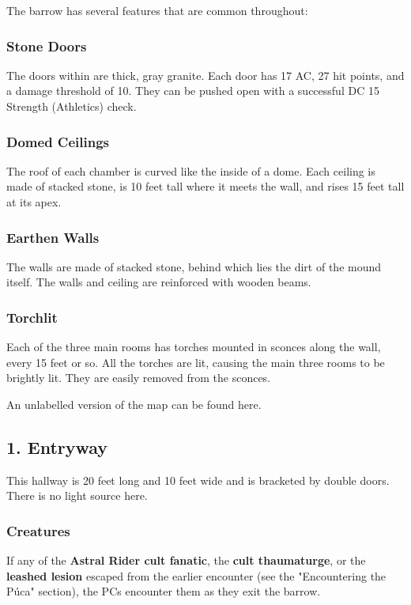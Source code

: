 \documentclass[10pt,a4paper,twoside,bg=print,twocolumn,openany,nodeprecatedcode]{dndbook}
\begin{document}
The barrow has several features that are common throughout:

\subsubsection{Stone Doors}
The doors within are thick, gray granite. Each door has 17 AC, 27 hit points, and a damage threshold of 10. They can be pushed open with a successful DC 15 Strength (Athletics) check.

\subsubsection{Domed Ceilings}
The roof of each chamber is curved like the inside of a dome. Each ceiling is made of stacked stone, is 10 feet tall where it meets the wall, and rises 15 feet tall at its apex.

\subsubsection{Earthen Walls}
The walls are made of stacked stone, behind which lies the dirt of the mound itself. The walls and ceiling are reinforced with wooden beams.

\subsubsection{Torchlit}
Each of the three main rooms has torches mounted in sconces along the wall, every 15 feet or so. All the torches are lit, causing the main three rooms to be brightly lit. They are easily removed from the sconces.

An unlabelled version of the map can be found here.

\subsection{1. Entryway}
This hallway is 20 feet long and 10 feet wide and is bracketed by double doors. There is no light source here.

\subsubsection{Creatures}
If any of the \textbf{Astral Rider cult fanatic}, the \textbf{cult thaumaturge}, or the \textbf{leashed lesion} escaped from the earlier encounter (see the "Encountering the Púca" section), the PCs encounter them as they exit the barrow.
\end{document}
